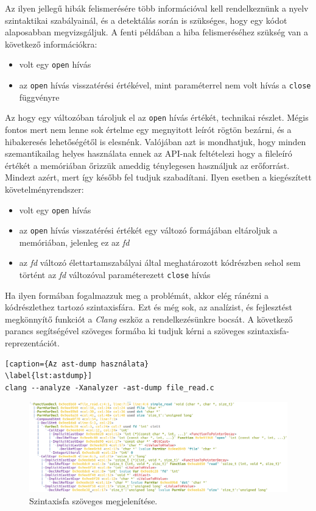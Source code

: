 \documentclass[a4paper,12pt]{report}
\begin{document}
Az ilyen jellegű hibák felismerésére több információval kell rendelkeznünk a nyelv szintaktikai szabályainál, és a detektálás során is szükséges, hogy egy kódot alaposabban megvizsgáljuk. A fenti példában a hiba felismeréséhez szükség van a következő információkra:
\begin{itemize}
\item volt egy \texttt{open} hívás
\item az \texttt{open} hívás visszatérési értékével, mint paraméterrel nem volt hívás a \texttt{close} függvényre
\end{itemize}
Az hogy egy változóban tároljuk el az \texttt{open} hívás értékét, technikai részlet. Mégis fontos mert nem lenne sok értelme egy megnyitott leírót rögtön bezárni, és a hibakeresés lehetőségétől is elesnénk.
Valójában azt is mondhatjuk, hogy minden szemantikailag helyes használata ennek az API-nak feltételezi hogy a fileleíró értékét a memóriában őrizzük ameddig ténylegesen használjuk az erőforrást. Mindezt azért, mert így később fel tudjuk szabadítani. Ilyen esetben a kiegészített követelményrendszer:
\begin{itemize}
\item volt egy \texttt{open} hívás
\item az \texttt{open} hívás visszatérési értékét egy változó formájában eltároljuk a memóriában, jelenleg ez az \emph{fd}
\item az \emph{fd} változó élettartamszabályai által meghatározott kódrészben sehol sem történt az \emph{fd} változóval paraméterezett \texttt{close} hívás
\end{itemize}
Ha ilyen formában fogalmazzuk meg a problémát, akkor elég ránézni a kódrészlethez tartozó szintaxisfára. Ezt és még sok, az analízist, és fejlesztést megkönnyítő funkciót a \emph{Clang} eszköz a rendelkezésünkre bocsát. A következő parancs segítségével szöveges formába ki tudjuk kérni a szöveges szintaxisfa-reprezentációt.
\begin{lstlisting}[caption={Az ast-dump használata}
\label{lst:astdump}]
clang --analyze -Xanalyzer -ast-dump file_read.c
\end{lstlisting}

\begin{figure}[h]
\centering
\includegraphics[scale=0.27]{astdumptomorrow.png}
\caption{Szintaxisfa szöveges megjelenítése.}
\end{figure}
\end{document}
